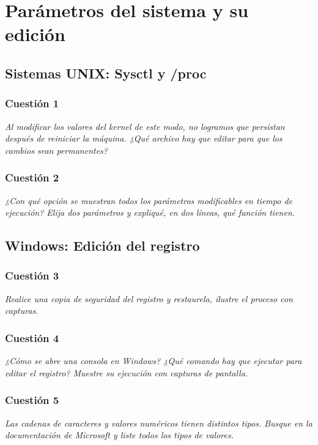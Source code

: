



\maketitle %
\newpage %
\tableofcontents %
\listoffigures
\newpage

\section{Parámetros del sistema y su edición}
\subsection{Sistemas UNIX: Sysctl y /proc}
\subsubsection{Cuestión 1}
\textit{Al modificar los valores del kernel de este modo, no logramos que persistan después de reiniciar la máquina. ¿Qué archivo hay que editar para que los cambios sean permanentes?}
\subsubsection{Cuestión 2}
\textit{¿Con qué opción se muestran todos los parámetros modificables en tiempo de ejecución? Elija dos parámetros y expliqué, en dos líneas, qué función tienen.}
\subsection{Windows: Edición del registro}
\subsubsection{Cuestión 3}
\textit{Realice una copia de seguridad del registro y restaurela, ilustre el proceso con capturas.}
\subsubsection{Cuestión 4}
\textit{¿Cómo se abre una consola en Windows? ¿Qué comando hay que ejecutar para editar el registro? Muestre su ejecución con capturas de pantalla.}
\subsubsection{Cuestión 5}
\textit{Las cadenas de caracteres y valores numéricos tienen distintos tipos. Busque en la documentación de Microsoft y liste todos los tipos de valores.}

